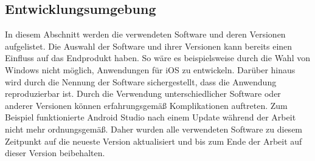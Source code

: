 \subsection{Entwicklungsumgebung}\label{subsection:entwicklungsumgebung}%
In diesem Abschnitt werden die verwendeten Software und deren Versionen aufgelistet. %
Die Auswahl der Software und ihrer Versionen kann bereits einen Einfluss auf das Endprodukt haben. So wäre es beispielsweise durch die Wahl von Windows nicht möglich, Anwendungen für iOS zu entwickeln.\newline%
	Darüber hinaus wird durch die Nennung der Software sichergestellt, dass die Anwendung reproduzierbar ist. Durch die Verwendung unterschiedlicher Software oder anderer Versionen können erfahrungsgemäß Komplikationen auftreten. Zum Beispiel funktionierte Android Studio nach einem Update während der Arbeit nicht mehr ordnungsgemäß. %
		Daher wurden alle verwendeten Software zu diesem Zeitpunkt auf die neueste Version aktualisiert und bis zum Ende der Arbeit auf dieser Version beibehalten. %


